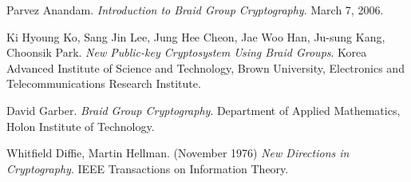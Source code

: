 \documentclass{article}
\theoremstyle{definition}
\begin{document}
\begin{thebibliography}{9}

Parvez Anandam. 
\textit{Introduction to Braid Group Cryptography}. 
March 7, 2006.
 
Ki Hyoung Ko, Sang Jin Lee, Jung Hee Cheon, Jae Woo Han, Ju-sung Kang, Choonsik Park.
\textit{New Public-key Cryptosystem Using Braid Groups}.
Korea Advanced Institute of Science and Technology, Brown University, Electronics and Telecommunications Research Institute. 

David Garber.
\textit{Braid Group Cryptography}.
Department of Applied Mathematics, Holon Institute of Technology. 
 
Whitfield Diffie, Martin Hellman. (November 1976)
\textit{New Directions in Cryptography}.
IEEE Transactions on Information Theory.
\end{thebibliography}






	
\end{document}
